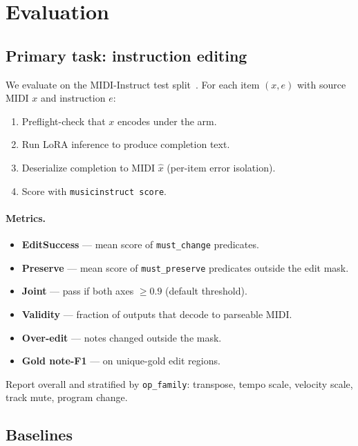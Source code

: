 \section{Evaluation}
\label{sec:eval}

\subsection{Primary task: instruction editing}

We evaluate on the MIDI-Instruct test split~\cite{goh2026midiinstruct}. For each item $(x, e)$ with source MIDI $x$ and instruction $e$:

\begin{enumerate}[leftmargin=*]
\item Preflight-check that $x$ encodes under the arm.
\item Run LoRA inference to produce completion text.
\item Deserialize completion to MIDI $\hat{x}$ (per-item error isolation).
\item Score with \texttt{musicinstruct score}.
\end{enumerate}

\paragraph{Metrics.}
\begin{itemize}[leftmargin=*]
\item \textbf{EditSuccess} --- mean score of \texttt{must\_change} predicates.
\item \textbf{Preserve} --- mean score of \texttt{must\_preserve} predicates outside the edit mask.
\item \textbf{Joint} --- pass if both axes $\geq 0.9$ (default threshold).
\item \textbf{Validity} --- fraction of outputs that decode to parseable MIDI.
\item \textbf{Over-edit} --- notes changed outside the mask.
\item \textbf{Gold note-F1} --- on unique-gold edit regions.
\end{itemize}

Report overall and stratified by \texttt{op\_family}: transpose, tempo scale, velocity scale, track mute, program change.

\subsection{Baselines}

